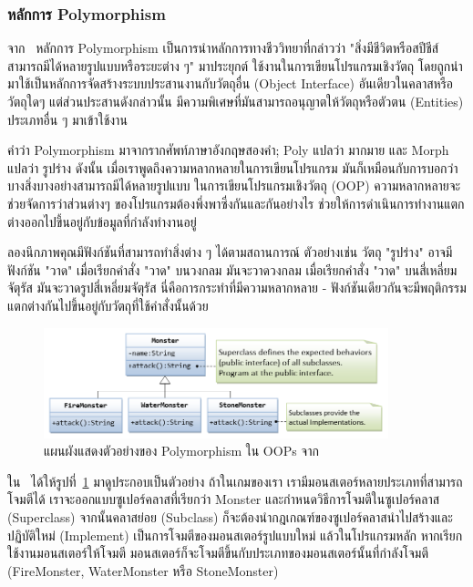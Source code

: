 \documentclass[12pt,one side,openright,a4paper]{cpe-thesis-th}
\newcommand{\thaijustify}[1]{%
  \par\hspace{30pt}\justifying
  #1
}
\begin{document}
        \subsubsection{หลักการ Polymorphism}
            \thaijustify{
                จาก~\cite{javapolymorph} หลักการ Polymorphism เป็นการนำหลักการทางชีววิทยาที่กล่าวว่า "สิ่งมีชีวิตหรือสปีชีส์สามารถมีได้หลายรูปแบบหรือระยะต่าง ๆ" มาประยุกต์ ใช้งานในการเขียนโปรแกรมเชิงวัตถุ โดยถูกนำมาใช้เป็นหลักการจัดสร้างระบบประสานงานกับวัตถุอื่น (Object Interface) อันเดียวในคลาสหรือวัตถุใดๆ แต่ส่วนประสานดังกล่าวนั้น มีความพิเศษที่มันสามารถอนุญาตให้วัตถุหรือตัวตน (Entities) ประเภทอื่น ๆ มาเข้าใช้งาน
            }
            \thaijustify{
                คำว่า Polymorphism มาจากรากศัพท์ภาษาอังกฤษสองคำ; Poly แปลว่า มากมาย และ Morph แปลว่า รูปร่าง ดังนั้น เมื่อเราพูดถึงความหลากหลายในการเขียนโปรแกรม มันก็เหมือนกับการบอกว่าบางสิ่งบางอย่างสามารถมีได้หลายรูปแบบ ในการเขียนโปรแกรมเชิงวัตถุ (OOP) ความหลากหลายจะช่วยจัดการว่าส่วนต่างๆ ของโปรแกรมต้องพึ่งพาซึ่งกันและกันอย่างไร ช่วยให้การดำเนินการทำงานแตกต่างออกไปขึ้นอยู่กับข้อมูลที่กำลังทำงานอยู่~\cite{nzeruekenneth23polymorph}
            }
            \thaijustify{
                ลองนึกภาพคุณมีฟังก์ชันที่สามารถทำสิ่งต่าง ๆ ได้ตามสถานการณ์ ตัวอย่างเช่น วัตถุ "รูปร่าง" อาจมีฟังก์ชัน "วาด" เมื่อเรียกคำสั่ง "วาด" บนวงกลม มันจะวาดวงกลม เมื่อเรียกคำสั่ง "วาด" บนสี่เหลี่ยมจัตุรัส มันจะวาดรูปสี่เหลี่ยมจัตุรัส นี่คือการกระทำที่มีความหลากหลาย - ฟังก์ชันเดียวกันจะมีพฤติกรรมแตกต่างกันไปขึ้นอยู่กับวัตถุที่ใช้คำสั่งนั้นด้วย~\cite{ntu20polymorph}
            }
            \begin{figure}[H]
                \centering
                \includegraphics[width=10cm]{figure/literature/oop-polymorphism.png}
                \caption[แผนผังแสดงตัวอย่างของ Polymorphism ใน OOPs]{แผนผังแสดงตัวอย่างของ Polymorphism ใน OOPs จาก~\cite{ntu20polymorph}}
                \label{fig:oop-polymorph}
            \end{figure}
            \thaijustify{
                 ใน~\cite{ntu20polymorph} ได้ให้รูปที่~\ref{fig:oop-polymorph} มาดูประกอบเป็นตัวอย่าง ถ้าในเกมของเรา เรามีมอนสเตอร์หลายประเภทที่สามารถโจมตีได้ เราจะออกแบบซูเปอร์คลาสที่เรียกว่า Monster และกำหนดวิธีการโจมตีในซูเปอร์คลาส (Superclass) จากนั้นคลาสย่อย (Subclass) ก็จะต้องนำกฎเกณฑ์ของซูเปอร์คลาสนำไปสร้างและปฏิบัติใหม่ (Implement) เป็นการโจมตีของมอนสเตอร์รูปแบบใหม่  แล้วในโปรแกรมหลัก หากเรียกใช้งานมอนสเตอร์ให้โจมตี มอนสเตอร์ก็จะโจมตีขึ้นกับประเภทของมอนสเตอร์นั้นที่กำลังโจมตี (FireMonster, WaterMonster หรือ StoneMonster)
            }
\end{document}
